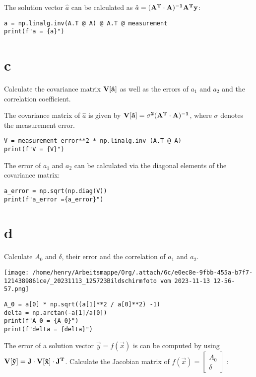 \documentclass[11pt]{article}
\begin{document}
The solution vector \(\hat{a}\) can be calculated as \(\hat{a} = (\bf{A}^{T} \cdot \bf{A})^{-1} \bf{A}^{T} y\):

\begin{verbatim}
a = np.linalg.inv(A.T @ A) @ A.T @ measurement
print(f"a = {a}")
\end{verbatim}
\section{c}
\label{sec:org6c79f24}

Calculate the covariance matrix \(\bf{V}[\hat{a}]\) as well as the errors of \(a_1\) and \(a_2\) and the correlation coefficient.

The covariance matrix of \(\hat{a}\) is given by \(\bf{V}[\hat{a}] = \sigma^2 (\bf{A}^{T} \cdot \bf{A})^{-1}\), where \(\sigma\) denotes the measurement error.

\begin{verbatim}
V = measurement_error**2 * np.linalg.inv (A.T @ A)
print(f"V = {V}")
\end{verbatim}

The error of \(a_1\) and \(a_2\) can be calculated via the diagonal elements of the covariance matrix:

\begin{verbatim}
a_error = np.sqrt(np.diag(V))
print(f"a_error ={a_error}")
\end{verbatim}
\section{d}
\label{sec:orga166d27}

Calculate \(A_0\) and \(\delta\), their error and the correlation of \(a_1\) and \(a_2\).

\begin{center}
\texttt{[image: /home/henry/Arbeitsmappe/Org/.attach/6c/e0ec8e-9fbb-455a-b7f7-1214389861ce/\_20231113\_125723Bildschirmfoto vom 2023-11-13 12-56-57.png]}
\end{center}

\begin{verbatim}
A_0 = a[0] * np.sqrt((a[1]**2 / a[0]**2) -1)
delta = np.arctan(-a[1]/a[0])
print(f"A_0 = {A_0}")
print(f"delta = {delta}")
\end{verbatim}

The error of a solution vector \(\vec{y} = f(\vec{x})\) is can be computed by using \(\bf{V}[\vec{y}] = \bf{J} \cdot \bf{V}[\vec{x}] \cdot \bf{J}^{T}\).
Calculate the Jacobian matrix of \(f(\vec{x}) = \begin{bmatrix} A_0 \\ \delta \end{bmatrix}\) :
\end{document}
